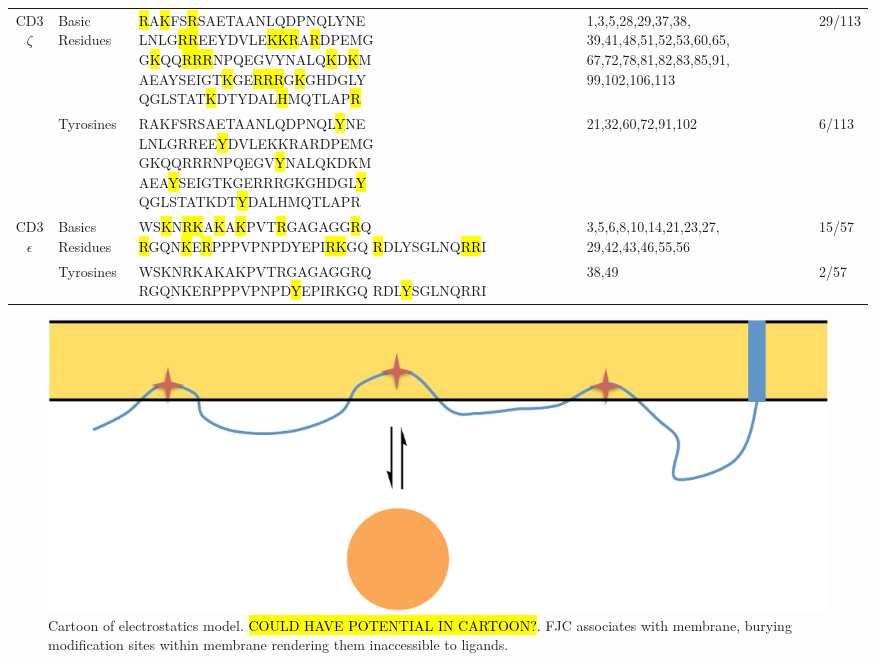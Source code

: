 \documentclass[../../AdvancementSummary.tex]{subfiles}
\begin{document}
{\begin{table}[H]
\begin{center}
\begin{tabular}{|c|p{2cm}|p{6cm}|p{3.5cm}|p{1.6cm}|}
	
    	\multicolumn{1}{|c|}{\multirow{2}[0]{*}{CD3$\zeta$}} 	&  	Basic Residues				& 	
	
	\hl{R}A\hl{K}FS\hl{R}SAETAANLQDPNQLYNE
	LNLG\hl{RR}EEYDVLE\hl{KKR}A\hl{R}DPEMG
	G\hl{K}QQ\hl{RRR}NPQEGVYNALQ\hl{K}D\hl{K}M
	AEAYSEIGT\hl{K}GE\hl{RRR}G\hl{K}GHDGLY
	QGLSTAT\hl{K}DTYDAL\hl{H}MQTLAP\hl{R}			& 	
	
	1,3,5,28,29,37,38,
	39,41,48,51,52,53,60,65,
	67,72,78,81,82,83,85,91,
	99,102,106,113 		& 	
	
	29/113	\\
	\cline{2-5}
	
	
	
		&	 Tyrosines									&	
	
	RAKFSRSAETAANLQDPNQL\hl{Y}NE
	LNLGRREE\hl{Y}DVLEKKRARDPEMG
	GKQQRRRNPQEGV\hl{Y}NALQKDKM
	AEA\hl{Y}SEIGTKGERRRGKGHDGL\hl{Y}
	QGLSTATKDT\hl{Y}DALHMQTLAPR 				& 	
	
	21,32,60,72,91,102											&	
	
	6/113			\\
	\hline
	
	
	\multicolumn{1}{|c|}{\multirow{2}{*}{CD3$\epsilon$}}	&	 Basics Residues		&
	
	WS\hl{K}N\hl{RK}A\hl{K}A\hl{K}PVT\hl{R}GAGAGG\hl{R}Q
	\hl{R}GQN\hl{K}E\hl{R}PPPVPNPDYEPI\hl{RK}GQ
	\hl{R}DLYSGLNQ\hl{RR}I					& 	
	
	3,5,6,8,10,14,21,23,27,
	29,42,43,46,55,56	&		
	
	15/57	\\
	\cline{2-5}
	
	
		&		 Tyrosines				& 	
	
	WSKNRKAKAKPVTRGAGAGGRQ
	RGQNKERPPPVPNPD\hl{Y}EPIRKGQ
	RDL\hl{Y}SGLNQRRI			&
	
	 38,49		& 		
	 
	 2/57			\\
	\hline
    \end{tabular}
    \end{center}
\end{table}

\begin{figure}[H]
\begin{center}
    \includegraphics[width=0.7\linewidth]{ElectrostaticsDiagram.pdf}
    \caption{Cartoon of electrostatics model.  \hl{COULD HAVE POTENTIAL IN CARTOON?}. FJC associates with membrane, burying modification sites within membrane rendering them inaccessible to ligands.\label{fig: ElectrostaticsCartoon}}
    \end{center}
\end{figure}


}
\end{document}
